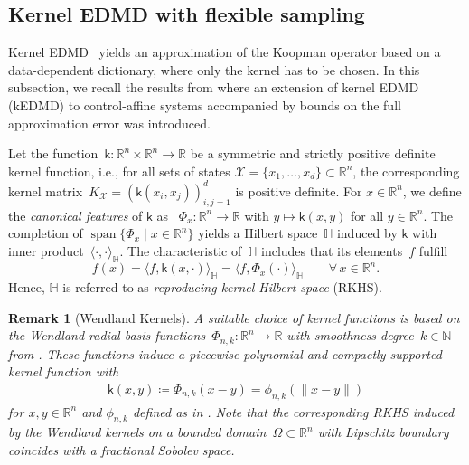 \documentclass[a4paper, reqno]{amsart}
\newcommand{\R}{\ensuremath{\mathbb R}}
\newcommand{\N}{\ensuremath{\mathbb N}}
\renewcommand{\k}{\mathsf{k}}
\newtheorem{remark}[theorem]{Remark}
\begin{document}
\subsection{Kernel EDMD with flexible sampling} \label{subsec:kernel:EDMD}
Kernel EDMD~\cite{klus2020kernel} yields an approximation of the Koopman operator based on a data-dependent dictionary, where only the kernel has to be chosen.
In this subsection, we recall the results from \cite[Section~4]{BoldPhil24} where an extension of kernel EDMD (kEDMD) to control-affine systems accompanied by bounds on the full approximation error was introduced.

Let the function~$\k:\R^n \times \R^n \rightarrow \R$ be a symmetric and strictly positive definite kernel function, i.e., for all sets of states $\mathcal{X} = \{x_1, \dots, x_d\} \subset \R^n$, the corresponding kernel matrix~$K_\mathcal{X} = \left(\k(x_i, x_j)\right)_{i, j = 1}^d$ is positive definite. For $x \in \R^n$, we define the \textit{canonical features} of $\k$ as ~$\Phi_x:\R^n \rightarrow \R$ with $y \mapsto \k(x, y)$ for all $y \in \R^n$.
The completion of $\operatorname{span}\{\Phi_x \mid x \in \R^n\}$ yields a Hilbert space~$\mathbb{H}$ induced by $\k$ with inner product~$\langle \cdot, \cdot\rangle_\mathbb{H}$. The characteristic of~$\mathbb{H}$ includes that its elements~$f$ fulfill 
\begin{equation}\label{eq:RKHS:reproducing-property}\tag{reproducing property}
    f(x) = \langle f, \k(x, \cdot) \rangle_\mathbb{H} = \langle f, \Phi_x(\cdot) \rangle_\mathbb{H} \qquad\forall\, x \in \mathbb{R}^n.
\end{equation}
Hence, $\mathbb{H}$ is referred to as \textit{reproducing kernel Hilbert space} (RKHS).\\

\begin{remark}[Wendland Kernels] \label{rem:Wendland}
    A suitable choice of kernel functions is based on the Wendland radial basis functions~$\Phi_{n, k}:\R^n \rightarrow \R$ with smoothness degree~$k \in \N$ from \cite{wendland2004approximate}. These functions induce a piecewise-polynomial and compactly-supported kernel function with 
    \begin{align*}
        \k(x, y) \coloneqq \Phi_{n, k}(x - y) = \phi_{n, k}(\|x - y\|) 
    \end{align*}
    for $x, y \in \R^n$ and $\phi_{n, k}$ defined as in \cite[Table 9.1]{wendland2004approximate}.
    Note that the corresponding RKHS induced by the Wendland kernels on a bounded domain~$\Omega \subset \R^n$ with Lipschitz boundary coincides with a fractional Sobolev space. 
\end{remark}
\end{document}

